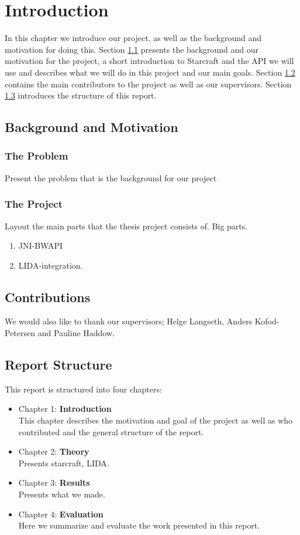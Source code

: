
\chapter{Introduction}
In this chapter we introduce our project, as well as the background and
motivation for doing this. Section \ref{sec:background} presents the background
and our motivation for the project, a short introduction to Starcraft and the
API we will use and describes what we will do in this project and our main
goals. Section \ref{sec:contributions} contains the main contributors to the
project as well as our supervisors. Section \ref{sec:structure} introduces the
structure of this report.

\section{Background and Motivation}
\label{sec:background}
\subsection{The Problem}
Present the problem that is the background for our project

\subsection{The Project}
\label{sec:project}
Layout the main parts that the thesis project consists of.
Big parts.
\begin{enumerate}
  \item JNI-BWAPI
  \item LIDA-integration.
\end{enumerate}

\section{Contributions}
\label{sec:contributions}
We would also like to thank our supervisors; Helge Langseth, Anders
Kofod-Petersen and Pauline Haddow.

\section{Report Structure}
\label{sec:structure}
This report is structured into four chapters:
\begin{itemize}
\item Chapter 1: \textbf{Introduction} \\
This chapter describes the motivation and goal of the project as well as who
contributed and the general structure of the report.
\item Chapter 2: \textbf{Theory} \\
Presents starcraft, LIDA.
\item Chapter 3: \textbf{Results} \\
Presents what we made.
\item Chapter 4: \textbf{Evaluation} \\
Here we summarize and evaluate the work presented in this report.

\end{itemize}